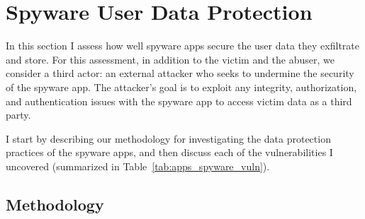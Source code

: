 \section{Spyware User Data Protection}
\label{sec:data-leak}



In this section I assess how well spyware apps secure the user data they exfiltrate and store.
For this assessment, in addition to the victim and the abuser, we
consider a third actor: an external attacker who seeks to undermine the
security of the spyware app.  The attacker's goal is to exploit any
integrity, authorization, and authentication issues with the spyware
app to access victim data as a third party.



I start by describing our
methodology for investigating the data protection practices of the
spyware apps, and then discuss each of the vulnerabilities I uncovered (summarized in Table~\ref{tab:apps_spyware_vuln}).

\subsection{Methodology}
\label{subsec:experiemental_setup}

